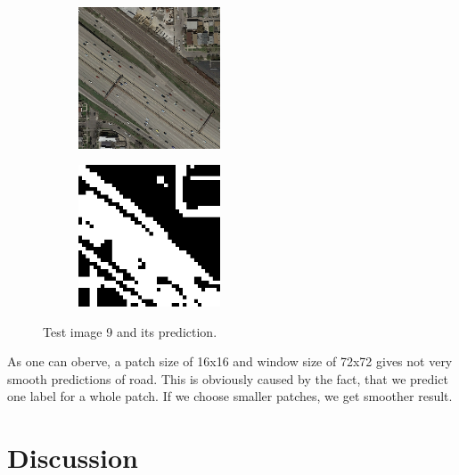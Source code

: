 \documentclass[10pt,conference,compsocconf]{IEEEtran}
\begin{document}
\begin{figure}[H]
	\centering
	\begin{subfigure}[htb]{0.2\textwidth}
		\includegraphics[width=4.2cm]{images/visualize_pred/images/test_9.png}
		\label{fig:test9}
	\end{subfigure}
	\hspace{1.5em}
	\begin{subfigure}[htb]{0.2\textwidth}
		\includegraphics[width=4.2cm]{images/visualize_pred/groundtruth/pred_9.png}
		\label{fig:pred9}
	\end{subfigure}
	\caption{Test image 9 and its prediction.}
\end{figure}



As one can oberve, a patch size of 16x16 and window size of 72x72 gives not very smooth predictions of road. This is obviously caused by the fact, that we predict one label for a whole patch. If we choose smaller patches, we get smoother result. 

\section{Discussion}
\end{document}
